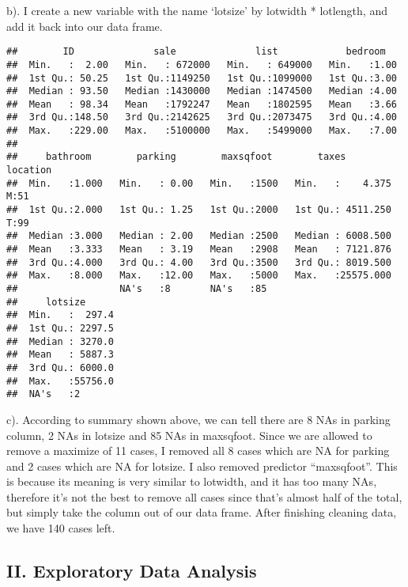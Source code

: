 \documentclass[
]{article}
\begin{document}
b). I create a new variable with the name `lotsize' by lotwidth *
lotlength, and add it back into our data frame.

\begin{verbatim}
##        ID              sale              list            bedroom    
##  Min.   :  2.00   Min.   : 672000   Min.   : 649000   Min.   :1.00  
##  1st Qu.: 50.25   1st Qu.:1149250   1st Qu.:1099000   1st Qu.:3.00  
##  Median : 93.50   Median :1430000   Median :1474500   Median :4.00  
##  Mean   : 98.34   Mean   :1792247   Mean   :1802595   Mean   :3.66  
##  3rd Qu.:148.50   3rd Qu.:2142625   3rd Qu.:2073475   3rd Qu.:4.00  
##  Max.   :229.00   Max.   :5100000   Max.   :5499000   Max.   :7.00  
##                                                                     
##     bathroom        parking        maxsqfoot        taxes           location
##  Min.   :1.000   Min.   : 0.00   Min.   :1500   Min.   :    4.375   M:51    
##  1st Qu.:2.000   1st Qu.: 1.25   1st Qu.:2000   1st Qu.: 4511.250   T:99    
##  Median :3.000   Median : 2.00   Median :2500   Median : 6008.500           
##  Mean   :3.333   Mean   : 3.19   Mean   :2908   Mean   : 7121.876           
##  3rd Qu.:4.000   3rd Qu.: 4.00   3rd Qu.:3500   3rd Qu.: 8019.500           
##  Max.   :8.000   Max.   :12.00   Max.   :5000   Max.   :25575.000           
##                  NA's   :8       NA's   :85                                 
##     lotsize       
##  Min.   :  297.4  
##  1st Qu.: 2297.5  
##  Median : 3270.0  
##  Mean   : 5887.3  
##  3rd Qu.: 6000.0  
##  Max.   :55756.0  
##  NA's   :2
\end{verbatim}

c). According to summary shown above, we can tell there are 8 NAs in
parking column, 2 NAs in lotsize and 85 NAs in maxsqfoot. Since we are
allowed to remove a maximize of 11 cases, I removed all 8 cases which
are NA for parking and 2 cases which are NA for lotsize. I also removed
predictor ``maxsqfoot''. This is because its meaning is very similar to
lotwidth, and it has too many NAs, therefore it's not the best to remove
all cases since that's almost half of the total, but simply take the
column out of our data frame. After finishing cleaning data, we have 140
cases left.

\hypertarget{ii.-exploratory-data-analysis}{%
\subsection{II. Exploratory Data
Analysis}\label{ii.-exploratory-data-analysis}}
\end{document}
